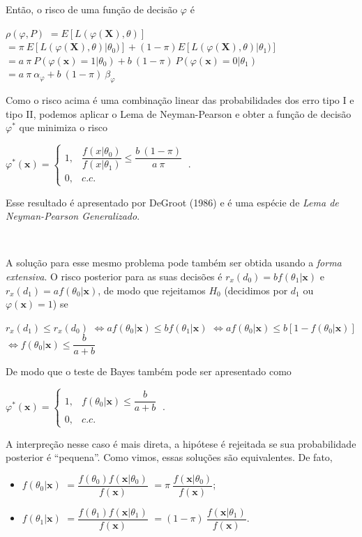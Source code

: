 \documentclass[
]{book}
\begin{document}
Então, o risco de uma função de decisão \(\varphi\) é

\(\rho(\varphi,P)\) \(=E\left[L(\varphi(\boldsymbol X),\theta)\right]\)
\(= \pi~E\left[L(\varphi(\boldsymbol X),\theta)\big|\theta_0)\right] + (1-\pi)E\left[L(\varphi(\boldsymbol X),\theta)\big|\theta_1)\right]\)
\(= a~\pi~P\left(\varphi(\boldsymbol x)=1\big|\theta_0\right) + b~(1-\pi)~P\left(\varphi(\boldsymbol x)=0\big|\theta_1\right)\)
\(= a~\pi~\alpha_\varphi + b~(1-\pi)~\beta_\varphi\)

Como o risco acima é uma combinação linear das probabilidades dos erro tipo I e tipo II, podemos aplicar o Lema de Neyman-Pearson e obter a função de decisão \(\varphi^*\) que minimiza o risco

\({\varphi}^*(\boldsymbol x)=\left\{\begin{array}{rl} 1,& \dfrac{f(x|\theta_0)}{f(x|\theta_1)}\leq \dfrac{b~(1-\pi)}{a~\pi}\\ 0,& c.c.\end{array}\right.~.\)

Esse resultado é apresentado por DeGroot (1986) e é uma espécie de \emph{Lema de Neyman-Pearson Generalizado}.

\(~\)

A solução para esse mesmo problema pode também ser obtida usando a \emph{forma extensiva}. O risco posterior para as suas decisões é \(r_x(d_0) = b f(\theta_1|\boldsymbol x)\) e \(r_x(d_1) = a f(\theta_0|\boldsymbol x)\), de modo que rejeitamos \(H_0\) (decidimos por \(d_1\) ou \(\varphi(\boldsymbol x)=1\)) se

\(r_x(d_1) \leq r_x(d_0)\)
\(\Longleftrightarrow a f(\theta_0|\boldsymbol x) \leq b f(\theta_1|\boldsymbol x)\)
\(\Longleftrightarrow a f(\theta_0|\boldsymbol x) \leq b \left[1-f(\theta_0|\boldsymbol x)\right]\)
\(\Longleftrightarrow f(\theta_0|\boldsymbol x) \leq \dfrac{b}{a+b}\)

De modo que o teste de Bayes também pode ser apresentado como

\({\varphi}^*(\boldsymbol x)=\left\{\begin{array}{rl} 1,& f(\theta_0|\boldsymbol x) \leq \dfrac{b}{a+b} \\ 0,& c.c.\end{array}\right.~.\)

A interpreção nesse caso é mais direta, a hipótese é rejeitada se sua probabilidade posterior é ``pequena''. Como vimos, essas soluções são equivalentes. De fato,

\begin{itemize}
\item
  \(f(\theta_0|\boldsymbol x)\) \(=\dfrac{f(\theta_0)f(\boldsymbol x|\theta_0)}{f(\boldsymbol x)}\) \(=\pi~\dfrac{f(\boldsymbol x|\theta_0)}{f(\boldsymbol x)}\);
\item
  \(f(\theta_1|\boldsymbol x)\) \(=\dfrac{f(\theta_1)f(\boldsymbol x|\theta_1)}{f(\boldsymbol x)}\) \(=(1-\pi)~\dfrac{f(\boldsymbol x|\theta_1)}{f(\boldsymbol x)}\).
\end{itemize}
\end{document}
